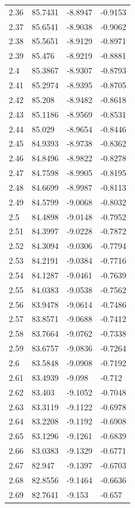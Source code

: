 \begin{tabular}{llll}
2.36 & 85.7431 & -8.8947 & -0.9153 \\
2.37 & 85.6541 & -8.9038 & -0.9062 \\
2.38 & 85.5651 & -8.9129 & -0.8971 \\
2.39 & 85.476 & -8.9219 & -0.8881 \\
2.4 & 85.3867 & -8.9307 & -0.8793 \\
2.41 & 85.2974 & -8.9395 & -0.8705 \\
2.42 & 85.208 & -8.9482 & -0.8618 \\
2.43 & 85.1186 & -8.9569 & -0.8531 \\
2.44 & 85.029 & -8.9654 & -0.8446 \\
2.45 & 84.9393 & -8.9738 & -0.8362 \\
2.46 & 84.8496 & -8.9822 & -0.8278 \\
2.47 & 84.7598 & -8.9905 & -0.8195 \\
2.48 & 84.6699 & -8.9987 & -0.8113 \\
2.49 & 84.5799 & -9.0068 & -0.8032 \\
2.5 & 84.4898 & -9.0148 & -0.7952 \\
2.51 & 84.3997 & -9.0228 & -0.7872 \\
2.52 & 84.3094 & -9.0306 & -0.7794 \\
2.53 & 84.2191 & -9.0384 & -0.7716 \\
2.54 & 84.1287 & -9.0461 & -0.7639 \\
2.55 & 84.0383 & -9.0538 & -0.7562 \\
2.56 & 83.9478 & -9.0614 & -0.7486 \\
2.57 & 83.8571 & -9.0688 & -0.7412 \\
2.58 & 83.7664 & -9.0762 & -0.7338 \\
2.59 & 83.6757 & -9.0836 & -0.7264 \\
2.6 & 83.5848 & -9.0908 & -0.7192 \\
2.61 & 83.4939 & -9.098 & -0.712 \\
2.62 & 83.403 & -9.1052 & -0.7048 \\
2.63 & 83.3119 & -9.1122 & -0.6978 \\
2.64 & 83.2208 & -9.1192 & -0.6908 \\
2.65 & 83.1296 & -9.1261 & -0.6839 \\
2.66 & 83.0383 & -9.1329 & -0.6771 \\
2.67 & 82.947 & -9.1397 & -0.6703 \\
2.68 & 82.8556 & -9.1464 & -0.6636 \\
2.69 & 82.7641 & -9.153 & -0.657 \\

\end{tabular}
